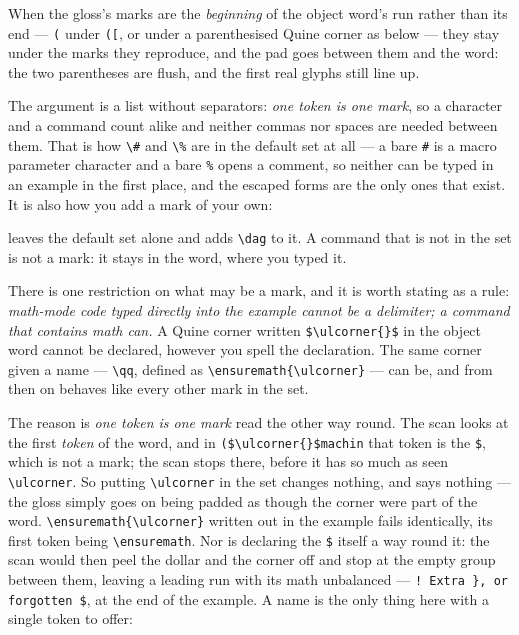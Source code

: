\documentclass[11pt,a4paper]{article}
\newcommand{\cs}[1]{\texttt{\textbackslash #1}}
\begin{document}
When the gloss's marks are the \emph{beginning} of the object word's run
rather than its end --- \texttt{(} under \texttt{([}, or under a
parenthesised Quine corner as below --- they stay under the marks they
reproduce, and the pad goes between them and the word: the two
parentheses are flush, and the first real glyphs still line up.

The argument is a list without separators: \emph{one token is one mark}, so a
character and a command count alike and neither commas nor spaces are needed
between them. That is how \verb|\#| and \verb|\%| are in the default set at
all --- a bare \texttt{\#} is a macro parameter character and a bare
\texttt{\%} opens a comment, so neither can be typed in an example in the
first place, and the escaped forms are the only ones that exist. It is also
how you add a mark of your own:

\begin{code}
\GlossPhantomChars{*?([<\#\%\dag}
\end{code}

\noindent leaves the default set alone and adds \cs{dag} to it. A command
that is not in the set is not a mark: it stays in the word, where you typed
it.

There is one restriction on what may be a mark, and it is worth stating as a
rule: \emph{math-mode code typed directly into the example cannot be a
delimiter; a command that contains math can.} A Quine corner written
\verb|$\ulcorner{}$| in the object word cannot be declared, however you
spell the declaration. The same corner given a name --- \cs{qq}, defined as
\verb|\ensuremath{\ulcorner}| --- can be, and from then on behaves like
every other mark in the set.

The reason is \emph{one token is one mark} read the other way round. The
scan looks at the first \emph{token} of the word, and in
\verb|($\ulcorner{}$machin| that token is the \texttt{\$}, which is not a
mark; the scan stops there, before it has so much as seen \cs{ulcorner}. So
putting \cs{ulcorner} in the set changes nothing, and says nothing --- the
gloss simply goes on being padded as though the corner were part of the
word. \verb|\ensuremath{\ulcorner}| written out in the example fails
identically, its first token being \cs{ensuremath}. Nor is declaring the
\texttt{\$} itself a way round it: the scan would then peel the dollar and
the corner off and stop at the empty group between them, leaving a leading
run with its math unbalanced --- \texttt{! Extra \}, or forgotten \$}, at
the end of the example. A name is the only thing here with a single token
to offer:
\end{document}
